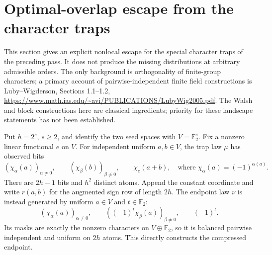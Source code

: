 \section{Optimal-overlap escape from the character traps}
\label{sec:compression-escape}
This section gives an explicit nonlocal escape for the special character
traps of the preceding pass. It does not produce the missing distributions
at arbitrary admissible orders. The only background is orthogonality of
finite-group characters; a primary account of pairwise-independent finite
field constructions is Luby--Wigderson, Sections 1.1--1.2,
\url{https://www.math.ias.edu/~avi/PUBLICATIONS/LubyWig2005.pdf}.
The Walsh and block constructions here are classical ingredients; priority
for these landscape statements has not been established.

Put $h=2^s$, $s\ge2$, and identify the two seed spaces with
$V=\mathbb F_2^s$. Fix a nonzero linear functional $e$ on $V$.
For independent uniform $a,b\in V$, the trap law $\mu$ has observed bits
\[
 (\chi_\alpha(a))_{\alpha\ne0},\qquad
 (\chi_\beta(b))_{\beta\ne0},\qquad
 \chi_e(a+b),
 \quad\text{where }\chi_\alpha(a)=(-1)^{\alpha(a)}.
\]
There are $2h-1$ bits and $h^2$ distinct atoms. Append the constant
coordinate and write $r(a,b)$ for the augmented sign row of length $2h$.
The endpoint law $\nu$ is instead generated by uniform $a\in V$ and
$t\in\mathbb F_2$:
\begin{equation}\label{eq:compression-endpoint}
 (\chi_\alpha(a))_{\alpha\ne0},\qquad
 ((-1)^t\chi_\beta(a))_{\beta\ne0},\qquad (-1)^t.
\end{equation}
Its masks are exactly the nonzero characters on $V\oplus\mathbb F_2$,
so it is balanced pairwise independent and uniform on $2h$ atoms.
This directly constructs the compressed endpoint.


